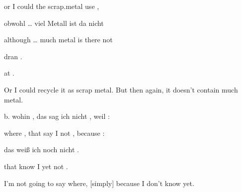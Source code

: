 \begin{styleMoutonExampleAlphaGloss}
or  I  could    the  scrap.metal    use    ,
\end{styleMoutonExampleAlphaGloss}

\begin{styleMoutonExampleAlphaGloss}
obwohl  …  viel    Metall  ist  da  nicht  
\end{styleMoutonExampleAlphaGloss}

\begin{styleMoutonExampleAlphaGloss}
although  …  much    metal    is  there  not
\end{styleMoutonExampleAlphaGloss}

\begin{styleMoutonExampleAlphaGloss}
dran  .
\end{styleMoutonExampleAlphaGloss}

\begin{styleMoutonExampleAlphaGloss}
at  .
\end{styleMoutonExampleAlphaGloss}

\begin{styleMoutonExamplesTransAlpha}
Or I could recycle it as scrap metal. But then again, it doesn’t con\-tain much metal.
\end{styleMoutonExamplesTransAlpha}

\begin{styleMoutonExampleAlpha}
b.  wohin  ,  das  sag  ich  nicht  ,  weil    :
\end{styleMoutonExampleAlpha}

\begin{styleMoutonExampleAlphaGloss}
where  ,  that  say  I  not  ,  because  :
\end{styleMoutonExampleAlphaGloss}

\begin{styleMoutonExampleAlphaGloss}
das  weiß  ich  noch    nicht  .
\end{styleMoutonExampleAlphaGloss}

\begin{styleMoutonExampleAlphaGloss}
that  know  I  yet    not  .
\end{styleMoutonExampleAlphaGloss}

\begin{styleMoutonExamplesTransAlpha}
I’m not going to say where, [simply] because I don’t know yet.
\end{styleMoutonExamplesTransAlpha}

